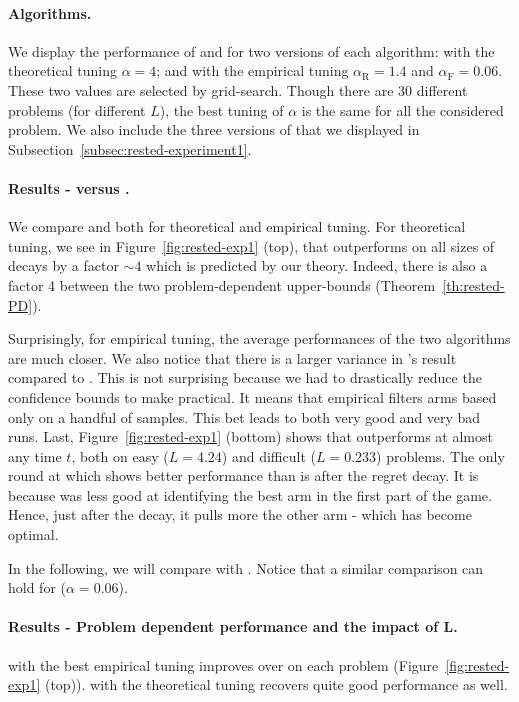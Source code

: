 \paragraph{Algorithms.} We display the performance of \RAWUCB and \FEWA for two versions of each algorithm: with the theoretical tuning $\alpha = 4$; and with the empirical tuning $\alpha_{\mathrm{R}} = 1.4$ and $\alpha_{\mathrm{F}} = 0.06$. These two values are selected by grid-search. Though there are 30 different problems (for different $L$), the best tuning of $\alpha$ is the same for all the considered problem. We also include the three versions of \wSWA that we displayed in Subsection~\ref{subsec:rested-experiment1}.


\paragraph{Results - {\RAWUCB} versus {\FEWA}.} We compare \RAWUCB and \FEWA both for theoretical and empirical tuning. For theoretical tuning, we see in Figure~\ref{fig:rested-exp1} (top), that \RAWUCB outperforms \FEWA on all sizes of decays by a factor $\sim 4$ which is predicted by our theory. Indeed, there is also a factor 4 between the two problem-dependent upper-bounds (Theorem~\ref{th:rested-PD}). 

Surprisingly, for empirical tuning, the average performances of the two algorithms are much closer. We also notice that there is a larger variance in \FEWA's result compared to \RAWUCB. This is not surprising because we had to drastically reduce the confidence bounds to make \FEWA practical. It means that empirical \FEWA filters arms based only on a handful of samples. This bet leads to both very good and very bad runs. Last, Figure~\ref{fig:rested-exp1} (bottom) shows that \RAWUCB outperforms \FEWA at almost any time $t$, both on easy ($L=4.24$) and difficult ($L=0.233$) problems. The only round at which \FEWA shows better performance than \RAWUCB is after the regret decay. It is because \FEWA was less good at identifying the best arm in the first part of the game. Hence, just after the decay, it pulls more the other arm - which has become optimal. 

In the following, we will compare \RAWUCB with \wSWA. Notice that a similar comparison can hold for \FEWA ($\alpha=0.06$).

\paragraph{Results - Problem dependent performance and the impact of L.} \RAWUCB with the best empirical tuning improves over \wSWA on each problem (Figure~\ref{fig:rested-exp1} (top)). \RAWUCB with the theoretical tuning recovers quite good performance as well. 

